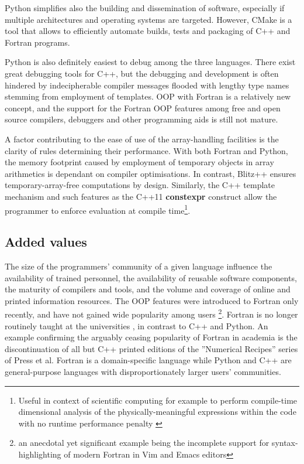 \documentclass[final,5p,times,twocolumn]{elsarticle}
\newcommand{\prog}[1]{{\rm\bf#1}}
\begin{document}
  Python simplifies also the building and dissemination of software,
    especially if multiple architectures and operating systems are targeted.
  However, CMake is a tool that allows to efficiently automate builds, tests and 
    packaging of C++ and Fortran programs.

  Python is also definitely easiest to debug among the three languages.
  There exist great debugging tools for C++, but the debugging and development is 
    often hindered by indecipherable compiler messages flooded with lengthy type names
    stemming from employment of templates.
  OOP with Fortran is a relatively new concept, and the support for the Fortran OOP
    features among free and open source compilers, debuggers and other programming
    aids is still not mature.
    
  A factor contributing to the ease of use of the array-handling 
    facilities is the clarity of rules determining their performance.
  With both Fortran and Python, the memory footprint caused by employment
    of temporary objects in array arithmetics is dependant on compiler optimisations.
  In contrast, Blitz++ ensures temporary-array-free computations by design.
  Similarly, the C++ template mechanism and such features as the C++11
    \prog{constexpr} construct allow the programmer to enforce evaluation
    at compile time\footnote{Useful in context of scientific computing for example to perform
    compile-time dimensional analysis of the physically-meaningful expressions within
    the code with no runtime performance penalty \citet{Schabel_et_al_2008}}.

  \subsection{Added values}

  The size of the programmers' community of a given language 
    influence the availability of trained personnel, 
    the availability of reusable software components,
    the maturity of compilers and tools, 
    and the volume and coverage of online and printed information resources.
  The OOP features were introduced to Fortran only recently, and have not gained
    wide popularity among users \citep{Worth_2008}\footnote{an anecdotal yet significant
    example being the incomplete support for syntax-highlighting of modern Fortran in Vim and Emacs editors}.
  Fortran is no longer routinely taught at the universities \citep{Kendall_et_al_2008},
    in contrast to C++ and Python.
  An example confirming the arguably ceasing popularity of Fortran in academia 
    is the discontinuation of all but C++ printed editions of the ''Numerical Recipes'' 
    series of Press et al.
  Fortran is a domain-specific language while Python and C++ are general-purpose languages
    with disproportionately larger users' communities.
\end{document}
